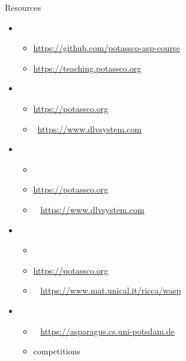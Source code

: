 \begin{frame}{Resources}
  \begin{itemize}
  \item {}
    \begin{itemize}
    \item \url{https://github.com/potassco-asp-course}
    \item \url{https://teaching.potassco.org}
    \end{itemize}
  \item {}
    \begin{itemize}
    \item \alert{\clingo} \cite{gekakasc17a}\hfill \url{https://potassco.org}
    \item \dlv\           \cite{dlv03a,alcadofuleperiveza17a}\hfill \url{https://www.dlvsystem.com}
    \end{itemize}
  \item {}
    \begin{itemize}
    \item \lparse\                                                %
    \item \alert{\gringo} \cite{gescth07a,gekaosscth09a,gekakosc11a}\hfill \url{https://potassco.org}
    \item \idlv\          \cite{cafupeza17a}                        \hfill\url{https://www.dlvsystem.com}
    \end{itemize}
  \item {}
    \begin{itemize}
    \item \smodels\       \cite{niesim96a,siniso02a}              %
    \item \alert{\clasp}  \cite{gekanesc07a,gekasc09c}              \hfill \url{https://potassco.org}
    \item \wasp\          \cite{aldofaleri13a}                      \hfill \url{https://www.mat.unical.it/ricca/wasp}
    \end{itemize}
  \item {}
    \begin{itemize}
    \item \asparagus\     \cite{boansctr04a}                        \hfill \url{https://asparagus.cs.uni-potsdam.de}
    \item competitions \cite{contest07a,contest09a,contest11a,contest11a,cagemari14a}
    \end{itemize}
  \end{itemize}
\end{frame}
%

